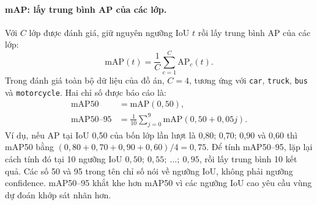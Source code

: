 \paragraph{mAP: lấy trung bình AP của các lớp.}
Với $C$ lớp được đánh giá, giữ nguyên ngưỡng IoU $t$ rồi lấy trung bình AP của các lớp:
\begin{equation}
  \mathrm{mAP}(t)=\frac{1}{C}\sum_{c=1}^{C}\mathrm{AP}_c(t).
  \label{eq:map_classes}
\end{equation}
Trong đánh giá toàn bộ dữ liệu của đồ án, $C=4$, tương ứng với \texttt{car}, \texttt{truck}, \texttt{bus} và \texttt{motorcycle}.
Hai chỉ số được báo cáo là:
\begin{align}
  \mathrm{mAP50} &= \mathrm{mAP}(0{,}50),
  \label{eq:map50}\\
  \mathrm{mAP50\text{--}95} &= \frac{1}{10}\sum_{j=0}^{9}
  \mathrm{mAP}(0{,}50+0{,}05j).
  \label{eq:map5095}
\end{align}
Ví dụ, nếu AP tại IoU 0,50 của bốn lớp lần lượt là 0,80; 0,70; 0,90 và 0,60 thì mAP50 bằng $(0{,}80+0{,}70+0{,}90+0{,}60)/4=0{,}75$.
Để tính mAP50--95, lặp lại cách tính đó tại 10 ngưỡng IoU $0{,}50;\ 0{,}55;\ \ldots;\ 0{,}95$, rồi lấy trung bình 10 kết quả.
Các số 50 và 95 trong tên chỉ số nói về ngưỡng IoU, không phải ngưỡng confidence.
mAP50--95 khắt khe hơn mAP50 vì các ngưỡng IoU cao yêu cầu vùng dự đoán khớp sát nhãn hơn.
